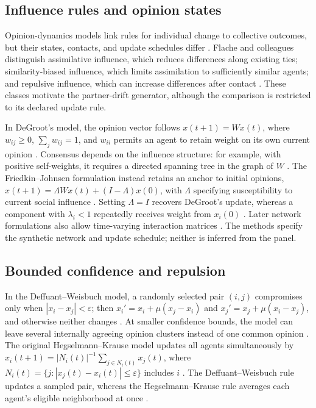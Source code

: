 \subsection{Influence rules and opinion states}

Opinion-dynamics models link rules for individual change to collective outcomes, but their states, contacts, and update schedules differ \cite{flache2017,sirbu2016}.
Flache and colleagues distinguish assimilative influence, which reduces differences along existing ties; similarity-biased influence, which limits assimilation to sufficiently similar agents; and repulsive influence, which can increase differences after contact \cite{flache2017}.
These classes motivate the partner-drift generator, although the comparison is restricted to its declared update rule.

In DeGroot's model, the opinion vector follows $x(t+1)=Wx(t)$, where $w_{ij}\geq0$, $\sum_jw_{ij}=1$, and $w_{ii}$ permits an agent to retain weight on its own current opinion \cite{degroot1974}.
Consensus depends on the influence structure: for example, with positive self-weights, it requires a directed spanning tree in the graph of $W$ \cite{proskurnikov2017}.
The Friedkin--Johnsen formulation instead retains an anchor to initial opinions, $x(t+1)=\Lambda Wx(t)+(I-\Lambda)x(0)$, with $\Lambda$ specifying susceptibility to current social influence \cite{friedkin1990,proskurnikov2017}.
Setting $\Lambda=I$ recovers DeGroot's update, whereas a component with $\lambda_i<1$ repeatedly receives weight from $x_i(0)$ \cite{proskurnikov2017}.
Later network formulations also allow time-varying interaction matrices \cite{proskurnikov2018}.
The methods specify the synthetic network and update schedule; neither is inferred from the panel.

\subsection{Bounded confidence and repulsion}

In the Deffuant--Weisbuch model, a randomly selected pair $(i,j)$ compromises only when $|x_i-x_j|<\varepsilon$; then $x_i'=x_i+\mu(x_j-x_i)$ and $x_j'=x_j+\mu(x_i-x_j)$, and otherwise neither changes \cite{deffuant2000,lorenz2007}.
At smaller confidence bounds, the model can leave several internally agreeing opinion clusters instead of one common opinion \cite{deffuant2000}.
The original Hegselmann--Krause model updates all agents simultaneously by $x_i(t+1)=|N_i(t)|^{-1}\sum_{j\in N_i(t)}x_j(t)$, where $N_i(t)=\{j:|x_j(t)-x_i(t)|\leq\varepsilon\}$ includes $i$ \cite{hegselmann2002}.
The Deffuant--Weisbuch rule updates a sampled pair, whereas the Hegselmann--Krause rule averages each agent's eligible neighborhood at once \cite{deffuant2000,hegselmann2002,lorenz2007}.

